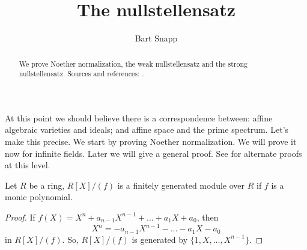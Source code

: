 \documentclass{ximera}
\author{Bart Snapp}
\title{The nullstellensatz}
\begin{document}
\begin{abstract}
  We prove Noether normalization, the weak nullstellensatz and the
  strong nullstellensatz. Sources and references:
  \cite{AM1969,dE1995,hM1986,mR1995}.
\end{abstract}
\maketitle


At this point we should believe there is a correspondence between:
affine algebraic varieties and ideals; and affine space and the prime
spectrum. Let's make this precise. We start by proving Noether
normalization. We will prove it now for infinite fields. Later we will
give a general proof. See \cite{iK1966,gK2011,eK1991} for alternate
proofs at this level.


\begin{proposition}\label{P:finiteext}
  Let $R$ be a ring, $R[X]/(f)$ is a finitely generated module over
  $R$ if $f$ is a monic polynomial.
  \begin{proof}
    If $f(X) = X^n + a_{n-1}X^{n-1} + \dots + a_1 X + a_0$, then
    \[
    X^n = -a_{n-1}X^{n-1} - \dots - a_1 X - a_0
    \]
    in $R[X]/(f)$. So, $R[X]/(f)$ is generated by
    $\{1,X,\dots,X^{n-1}\}$.
  \end{proof}
\end{proposition}
\end{document}

